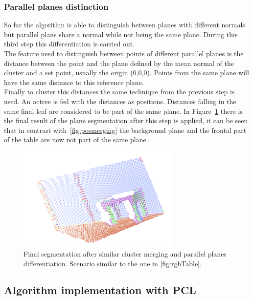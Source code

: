 \documentclass[fontsize=12pt]{article}
\begin{document}
\subsubsection{Parallel planes distinction}

So far the algorithm is  able to distinguish between planes with different normals but parallel plans share a normal while not being the same plane. During this third step this differentiation is carried out.\\


The feature used to distinguish between points of different parallel planes is the distance between the point and the plane defined by the mean normal of the cluster and a set point, usually the origin (0,0,0). Points from the same plane will have the same distance to this reference plane.\\

Finally to cluster this distances the same technique from the previous step is used. An octree is fed with the distances as positions. Distances falling in the same final leaf are considered to be part of the same plane. In Figure~\ref{fig:final_segmentation} there is the final result of the plane segmentation after this step is applied, it can be seen that in contrast with~\ref{fig:posmerging} the background plane and the frontal part of the table are now not part of the same plane.\\

\begin{figure}[!htbp]
  \begin{center}
    \includegraphics[width=8cm]{./images/finalSegmentation.png}
    \caption{Final segmentation after similar cluster merging and parallel planes differentiation. Scenario similar to the one in \ref{fig:rgbTable}.}
    \label{fig:final_segmentation}
  \end{center}
\end{figure}


\subsection{Algorithm implementation with PCL}
\label{sub:algorithm_implementation_with_pcl}
\end{document}
